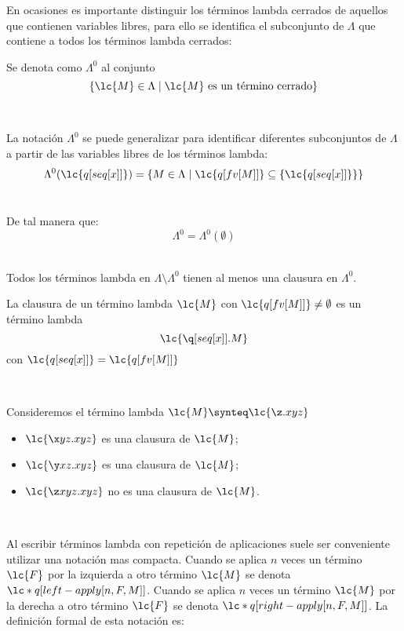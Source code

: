 En ocasiones es importante distinguir los términos lambda cerrados de aquellos que contienen variables libres, para ello se identifica el subconjunto de \(\Lambda\) que contiene a todos los términos lambda cerrados: \\

\begin{defi} Se denota como \(\Lambda^{0}\) al conjunto \
  \label{definicion:terminoscerrados}
  \[\{\lc{M} \in \Lambda \mid \lc{M} \text{ es un término cerrado}\}\]
\end{defi} \

La notación \(\Lambda^{0}\) se puede generalizar para identificar diferentes subconjuntos de \(\Lambda\) a partir de las variables libres de los términos lambda: \\

\[\Lambda^{0}(\lc{q[seq[x]]})=\{M\in\Lambda \mid \lc{q[fv[M]]}\subseteq \{\lc{q[seq[x]]}\}\}\] \

De tal manera que: \\

\[\Lambda^{0} = \Lambda^{0}(\emptyset)\] \

Todos los términos lambda en \(\Lambda \setminus \Lambda^{0}\) tienen al menos una clausura en \(\Lambda^{0}\). \\

\begin{defi}[Clausura] La clausura de un término lambda \(\lc{M}\) con \(\lc{q[fv[M]]} \not= \emptyset\) es un término lambda
  \label{definicion:clausura}
  \[\lc{\q[seq[x]].M}\]
  con \(\lc{q[seq[x]]}=\lc{q[fv[M]]}\)
\end{defi} \

\begin{ejemplo} Consideremos el término lambda \(\lc{M} \synteq \lc{\z.x y z}\)
  \begin{itemize}
  \item \(\lc{\x y z.x y z}\) es una clausura de \(\lc{M}\);
  \item \(\lc{\y x z.x y z}\) es una clausura de \(\lc{M}\);
  \item \(\lc{\z x y z.x y z}\) no es una clausura de \(\lc{M}\).
  \end{itemize}
\end{ejemplo} \

Al escribir términos lambda con repetición de aplicaciones suele ser conveniente utilizar una notación mas compacta. Cuando se aplica \(n\) veces un término \(\lc{F}\) por la izquierda a otro término \(\lc{M}\) se denota \(\lc*{q[left-apply[n,F,M]]}\). Cuando se aplica \(n\) veces un término \(\lc{M}\) por la derecha a otro término \(\lc{F}\) se denota \(\lc*{q[right-apply[n,F,M]]}\). La definición formal de esta notación es: \\

